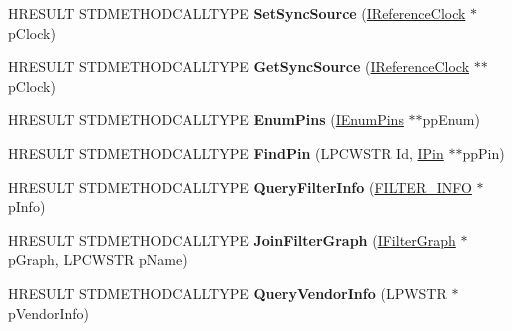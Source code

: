 \begin{DoxyCompactItemize}
\item 
\mbox{\label{class_c_ks_proxy_a4055a427aa2132f0a6325be8af26a6a2}} 
H\+R\+E\+S\+U\+LT S\+T\+D\+M\+E\+T\+H\+O\+D\+C\+A\+L\+L\+T\+Y\+PE {\bfseries Set\+Sync\+Source} (\hyperlink{interface_i_reference_clock}{I\+Reference\+Clock} $\ast$p\+Clock)
\item 
\mbox{\label{class_c_ks_proxy_aa5a84bff7149f17d36cf1902cd0871ff}} 
H\+R\+E\+S\+U\+LT S\+T\+D\+M\+E\+T\+H\+O\+D\+C\+A\+L\+L\+T\+Y\+PE {\bfseries Get\+Sync\+Source} (\hyperlink{interface_i_reference_clock}{I\+Reference\+Clock} $\ast$$\ast$p\+Clock)
\item 
\mbox{\label{class_c_ks_proxy_a9a8c1ff492a4d94adeaa154fe2c9def5}} 
H\+R\+E\+S\+U\+LT S\+T\+D\+M\+E\+T\+H\+O\+D\+C\+A\+L\+L\+T\+Y\+PE {\bfseries Enum\+Pins} (\hyperlink{interface_i_enum_pins}{I\+Enum\+Pins} $\ast$$\ast$pp\+Enum)
\item 
\mbox{\label{class_c_ks_proxy_aea4b1d0f8ecedfd9c91d0cc0eedc829d}} 
H\+R\+E\+S\+U\+LT S\+T\+D\+M\+E\+T\+H\+O\+D\+C\+A\+L\+L\+T\+Y\+PE {\bfseries Find\+Pin} (L\+P\+C\+W\+S\+TR Id, \hyperlink{interface_i_pin}{I\+Pin} $\ast$$\ast$pp\+Pin)
\item 
\mbox{\label{class_c_ks_proxy_a04ee40d2e90a2916d72328f5745790b7}} 
H\+R\+E\+S\+U\+LT S\+T\+D\+M\+E\+T\+H\+O\+D\+C\+A\+L\+L\+T\+Y\+PE {\bfseries Query\+Filter\+Info} (\hyperlink{struct_i_base_filter_1_1___filter_info}{F\+I\+L\+T\+E\+R\+\_\+\+I\+N\+FO} $\ast$p\+Info)
\item 
\mbox{\label{class_c_ks_proxy_a46a82f204da11882ce75b2dcc52527c2}} 
H\+R\+E\+S\+U\+LT S\+T\+D\+M\+E\+T\+H\+O\+D\+C\+A\+L\+L\+T\+Y\+PE {\bfseries Join\+Filter\+Graph} (\hyperlink{interface_i_filter_graph}{I\+Filter\+Graph} $\ast$p\+Graph, L\+P\+C\+W\+S\+TR p\+Name)
\item 
\mbox{\label{class_c_ks_proxy_aed4dfcb6d163ab7d3b596ea94373bc89}} 
H\+R\+E\+S\+U\+LT S\+T\+D\+M\+E\+T\+H\+O\+D\+C\+A\+L\+L\+T\+Y\+PE {\bfseries Query\+Vendor\+Info} (L\+P\+W\+S\+TR $\ast$p\+Vendor\+Info)
\item 
\mbox{\label{class_c_ks_proxy_a5b40adf8e482bdc0dddf53257ec67700}} 
$$
\end{DoxyCompactItemize}
